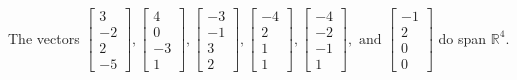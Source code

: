\begin{exercise}
\begin{exerciseStatement}
  \end{exerciseStatement}
  \begin{exerciseAnswer}
   The vectors \(\left[\begin{array}{r}
3 \\
-2 \\
2 \\
-5
\end{array}\right] , \left[\begin{array}{r}
4 \\
0 \\
-3 \\
1
\end{array}\right] , \left[\begin{array}{r}
-3 \\
-1 \\
3 \\
2
\end{array}\right] , \left[\begin{array}{r}
-4 \\
2 \\
1 \\
1
\end{array}\right] , \left[\begin{array}{r}
-4 \\
-2 \\
-1 \\
1
\end{array}\right] , \text{ and } \left[\begin{array}{r}
-1 \\
2 \\
0 \\
0
\end{array}\right]\) 
  	 do  
	span \(\mathbb{R}^4\).
  


  \end{exerciseAnswer}
\end{exercise}